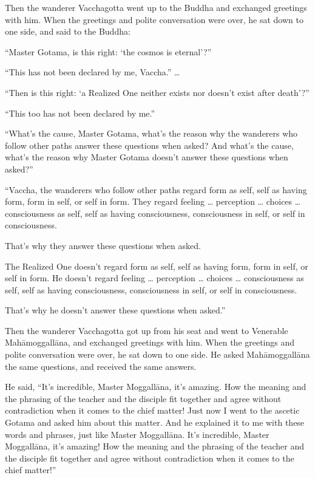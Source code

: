 \documentclass[12pt,openany]{book}%
\begin{document}
Then the wanderer Vacchagotta went up to the Buddha and exchanged greetings with him. When the greetings and polite conversation were over, he sat down to one side, and said to the Buddha: 

“Master Gotama, is this right: ‘the cosmos is eternal’?” 

“This has not been declared by me, Vaccha.” … 

“Then is this right: ‘a Realized One neither exists nor doesn’t exist after death’?” 

“This too has not been declared by me.” 

“What’s the cause, Master Gotama, what’s the reason why the wanderers who follow other paths answer these questions when asked? And what’s the cause, what’s the reason why Master Gotama doesn’t answer these questions when asked?” 

“Vaccha, the wanderers who follow other paths regard form as self, self as having form, form in self, or self in form. They regard feeling … perception … choices … consciousness as self, self as having consciousness, consciousness in self, or self in consciousness. 

That’s why they answer these questions when asked. 

The Realized One doesn’t regard form as self, self as having form, form in self, or self in form. He doesn’t regard feeling … perception … choices … consciousness as self, self as having consciousness, consciousness in self, or self in consciousness. 

That’s why he doesn’t answer these questions when asked.” 

Then the wanderer Vacchagotta got up from his seat and went to Venerable \textsanskrit{Mahāmoggallāna}, and exchanged greetings with him. When the greetings and polite conversation were over, he sat down to one side. He asked \textsanskrit{Mahāmoggallāna} the same questions, and received the same answers. 

He said, “It’s incredible, Master \textsanskrit{Moggallāna}, it’s amazing. How the meaning and the phrasing of the teacher and the disciple fit together and agree without contradiction when it comes to the chief matter! Just now I went to the ascetic Gotama and asked him about this matter. And he explained it to me with these words and phrases, just like Master \textsanskrit{Moggallāna}. It’s incredible, Master \textsanskrit{Moggallāna}, it’s amazing! How the meaning and the phrasing of the teacher and the disciple fit together and agree without contradiction when it comes to the chief matter!” 
\end{document}
